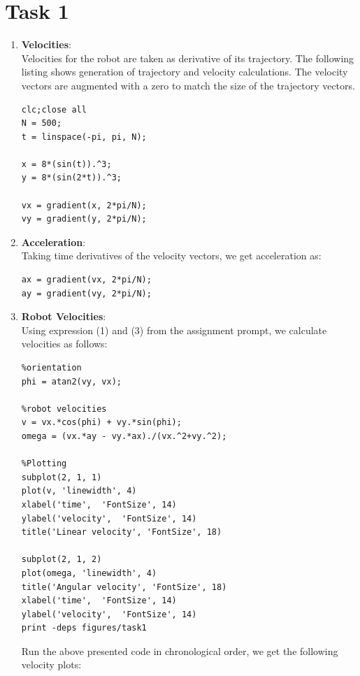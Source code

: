 \documentclass[12pt,letterpaper]{article}
\begin{document}
\section*{Task 1}



\begin{enumerate}
  \item
   \textbf{Velocities}: \\
   Velocities for the robot are taken as derivative of its trajectory. The following listing shows generation of trajectory and velocity calculations. The velocity vectors are augmented with a zero to match the size of the trajectory vectors.
\begin{lstlisting}
clc;close all 
N = 500; 
t = linspace(-pi, pi, N); 

x = 8*(sin(t)).^3; 
y = 8*(sin(2*t)).^3; 

vx = gradient(x, 2*pi/N);
vy = gradient(y, 2*pi/N);
\end{lstlisting}
  \item
\textbf{Acceleration}:\\
Taking time derivatives of the velocity vectors, we get acceleration as: 

\begin{lstlisting}
ax = gradient(vx, 2*pi/N);
ay = gradient(vy, 2*pi/N);
\end{lstlisting}

\item 
\textbf{Robot Velocities}:\\
Using expression (1) and (3) from the assignment prompt, we calculate velocities as follows: 
\begin{lstlisting}
%orientation
phi = atan2(vy, vx); 

%robot velocities
v = vx.*cos(phi) + vy.*sin(phi); 
omega = (vx.*ay - vy.*ax)./(vx.^2+vy.^2); 

%Plotting
subplot(2, 1, 1)
plot(v, 'linewidth', 4) 
xlabel('time',  'FontSize', 14)
ylabel('velocity',  'FontSize', 14)
title('Linear velocity', 'FontSize', 18)

subplot(2, 1, 2)
plot(omega, 'linewidth', 4)
title('Angular velocity', 'FontSize', 18)
xlabel('time',  'FontSize', 14)
ylabel('velocity',  'FontSize', 14)
print -deps figures/task1 
\end{lstlisting}

Run the above presented code in chronological order, we get the following velocity plots:


\end{enumerate}
\end{document}
